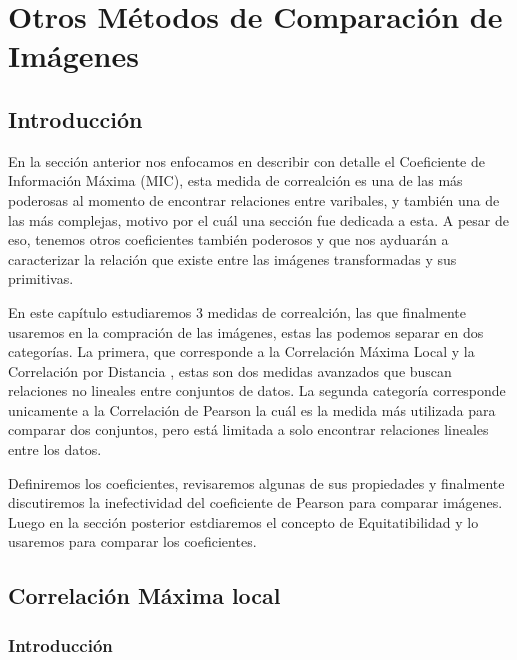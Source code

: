 \chapter{Otros M\'etodos de Comparaci\'on de Im\'agenes}\label{chap3}


\section{Introducci\'on}

En la secci\'on anterior nos enfocamos en describir con detalle el Coeficiente de Informaci\'on M\'axima (MIC), esta medida de correalci\'on es una de las m\'as poderosas al momento de encontrar relaciones entre varibales, y tambi\'en una de las m\'as complejas, motivo por el cu\'al una secci\'on fue dedicada a esta. A pesar de eso, tenemos otros coeficientes tambi\'en poderosos y que nos ayduar\'an a caracterizar la relaci\'on que existe entre las im\'agenes transformadas y sus primitivas. 

En este cap\'itulo estudiaremos 3 medidas de correalci\'on, las que finalmente usaremos en la compraci\'on de las im\'agenes, estas las podemos separar en dos categorías. La primera, que corresponde a la Correlaci\'on M\'axima Local\cite{Chen2012} y la Correlaci\'on por Distancia \cite{Szekely2009}, estas son dos medidas avanzados que buscan relaciones no lineales entre conjuntos de datos. La segunda categor\'ia corresponde unicamente a la Correlaci\'on de Pearson la cu\'al es la medida m\'as utilizada para comparar dos conjuntos, pero est\'a limitada a solo encontrar relaciones lineales entre los datos.

Definiremos los coeficientes, revisaremos algunas de sus propiedades y finalmente discutiremos la inefectividad del coeficiente de Pearson para comparar im\'agenes. Luego en la secci\'on posterior estdiaremos el concepto de Equitatibilidad y lo usaremos para comparar los coeficientes. 

\section[]{Correlaci\'on M\'axima local} 


	\subsection{Introducci\'on}


